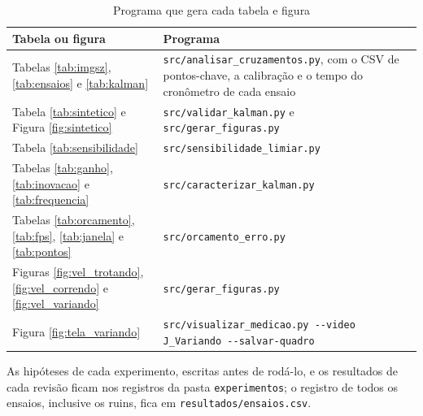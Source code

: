 \documentclass[
    12pt,               %
    openright,          %
    twoside,            %
    a4paper,            %
    chapter=TITLE,      %
    english,            %
    brazil              %
    ]{abntex2}
\begin{document}
\begin{apendicesenv}
\begin{table}[H]
\centering
\small
\caption{Programa que gera cada tabela e figura}
\label{tab:reproducao}
\begin{tabular}{L{0.30\textwidth}L{0.60\textwidth}}
\hline
\textbf{Tabela ou figura} & \textbf{Programa} \\
\hline
Tabelas \ref{tab:imgsz}, \ref{tab:ensaios} e \ref{tab:kalman} & \texttt{src/analisar\_cruzamentos.py}, com o CSV de pontos-chave, a calibração e o tempo do cronômetro de cada ensaio \\
Tabela \ref{tab:sintetico} e Figura \ref{fig:sintetico} & \texttt{src/validar\_kalman.py} e \texttt{src/gerar\_figuras.py} \\
Tabela \ref{tab:sensibilidade} & \texttt{src/sensibilidade\_limiar.py} \\
Tabelas \ref{tab:ganho}, \ref{tab:inovacao} e \ref{tab:frequencia} & \texttt{src/caracterizar\_kalman.py} \\
Tabelas \ref{tab:orcamento}, \ref{tab:fps}, \ref{tab:janela} e \ref{tab:pontos} & \texttt{src/orcamento\_erro.py} \\
Figuras \ref{fig:vel_trotando}, \ref{fig:vel_correndo} e \ref{fig:vel_variando} & \texttt{src/gerar\_figuras.py} \\
Figura \ref{fig:tela_variando} & \texttt{src/visualizar\_medicao.py -{}-video J\_Variando -{}-salvar-quadro} \\
\hline
\end{tabular}
\end{table}

As hipóteses de cada experimento, escritas antes de rodá-lo, e os resultados de cada revisão ficam nos registros da pasta \texttt{experimentos}; o registro de todos os ensaios, inclusive os ruins, fica em \texttt{resultados/ensaios.csv}.

\end{apendicesenv}
\end{document}
